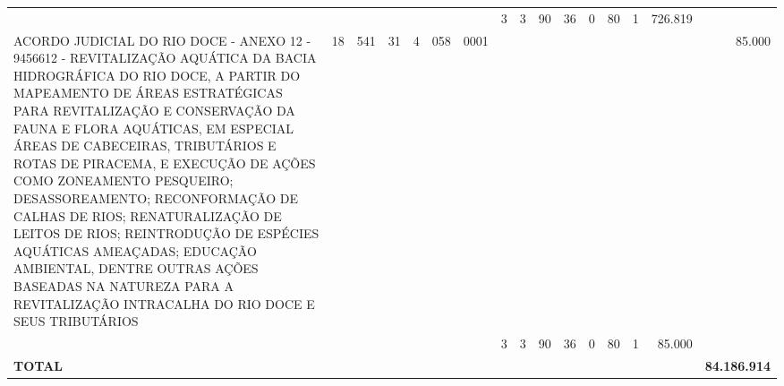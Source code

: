 \documentclass{article}
\begin{document}
\begin{longtable}[c]{m{6.5cm}|m{1pt}m{1pt}m{1pt}m{1pt}m{1pt}m{1pt}|m{1pt}m{1pt}m{0.5pt}m{1pt}|m{1pt}|m{1pt}m{1pt}|m{1pt}|m{2pt}}
& & & & & & & \multicolumn{1}{c}{ 3 } & \multicolumn{1}{c}{ 3 } & \multicolumn{1}{c}{ 90 } & \multicolumn{1}{c|}{ 36 } & \multicolumn{1}{c|}{ 0 } & \multicolumn{1}{l}{ 80 } & \multicolumn{1}{c|}{ 1 } & \multicolumn{1}{r|}{ 726.819 } & \\
\multicolumn{1}{L{5.5cm}|}{ ACORDO JUDICIAL DO RIO DOCE - ANEXO 12 - 9456612 - REVITALIZAÇÃO AQUÁTICA DA BACIA HIDROGRÁFICA DO RIO DOCE, A PARTIR DO MAPEAMENTO DE ÁREAS ESTRATÉGICAS PARA REVITALIZAÇÃO E CONSERVAÇÃO DA FAUNA E FLORA AQUÁTICAS, EM ESPECIAL ÁREAS DE CABECEIRAS, TRIBUTÁRIOS E ROTAS DE PIRACEMA, E EXECUÇÃO DE AÇÕES COMO ZONEAMENTO PESQUEIRO; DESASSOREAMENTO; RECONFORMAÇÃO DE CALHAS DE RIOS; RENATURALIZAÇÃO DE LEITOS DE RIOS; REINTRODUÇÃO DE ESPÉCIES AQUÁTICAS AMEAÇADAS; EDUCAÇÃO AMBIENTAL, DENTRE OUTRAS AÇÕES BASEADAS NA NATUREZA PARA A REVITALIZAÇÃO INTRACALHA DO RIO DOCE E SEUS TRIBUTÁRIOS } & \multicolumn{1}{c}{ 18 } & \multicolumn{1}{c}{ 541 } & \multicolumn{1}{c}{ 31 } & \multicolumn{1}{l}{ 4 } & \multicolumn{1}{c}{ 058 } & \multicolumn{1}{l|}{ 0001 } & & & & & & & & & \multicolumn{1}{r}{ 85.000 } \\
& & & & & & & \multicolumn{1}{c}{ 3 } & \multicolumn{1}{c}{ 3 } & \multicolumn{1}{c}{ 90 } & \multicolumn{1}{c|}{ 36 } & \multicolumn{1}{c|}{ 0 } & \multicolumn{1}{l}{ 80 } & \multicolumn{1}{c|}{ 1 } & \multicolumn{1}{r|}{ 85.000 } & \\
\hline
\multicolumn{15}{C{6cm}|}{\textbf{ TOTAL }} & \multicolumn{1}{r}{\textbf{ 84.186.914 }} \\
\end{longtable}
\newpage
{}
{}
\renewcommand*{\arraystretch}{1.9}
\scriptsize
\color{myblack}
\centering
\end{document}
